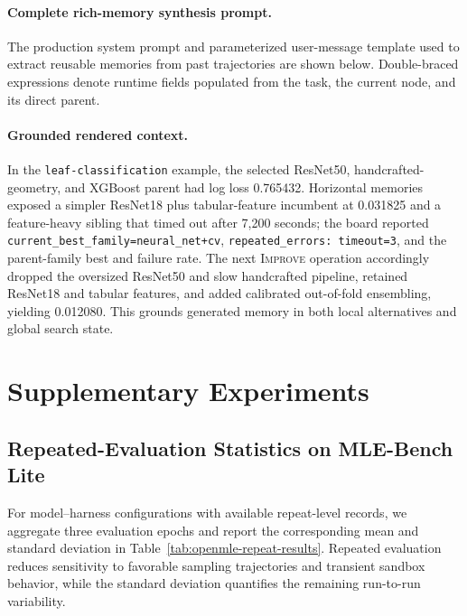 \hypertarget{openmleevo-rich-memory-prompt}{\paragraph{Complete rich-memory synthesis prompt.}}
The production system prompt and parameterized user-message template used to extract reusable memories from past trajectories are shown below. Double-braced expressions denote runtime fields populated from the task, the current node, and its direct parent.



\paragraph{Grounded rendered context.}
In the \texttt{leaf-classification} example, the selected ResNet50, handcrafted-geometry, and XGBoost parent had log loss 0.765432. Horizontal memories exposed a simpler ResNet18 plus tabular-feature incumbent at 0.031825 and a feature-heavy sibling that timed out after 7,200 seconds; the board reported \nolinkurl{current_best_family=neural_net+cv}, \nolinkurl{repeated_errors: timeout=3}, and the parent-family best and failure rate. The next \textsc{Improve} operation accordingly dropped the oversized ResNet50 and slow handcrafted pipeline, retained ResNet18 and tabular features, and added calibrated out-of-fold ensembling, yielding 0.012080. This grounds generated memory in both local alternatives and global search state.

\section{Supplementary Experiments}

\subsection{Repeated-Evaluation Statistics on MLE-Bench Lite}
\label{app:openmle-repeat-evaluation}

For model--harness configurations with available repeat-level records, we
aggregate three evaluation epochs and report the corresponding mean and
standard deviation in Table~\ref{tab:openmle-repeat-results}. Repeated
evaluation reduces sensitivity to favorable sampling trajectories and
transient sandbox behavior, while the standard deviation quantifies the
remaining run-to-run variability.

